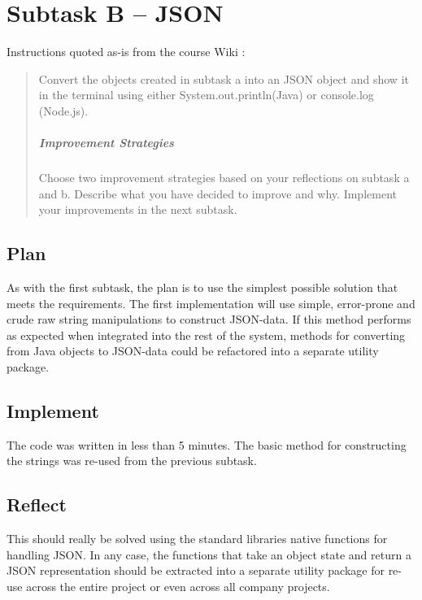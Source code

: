 \section{Subtask B -- JSON}\label{subtask-b-json}
Instructions quoted as-is from the course Wiki \cite{1dv600:lab1:instructions}:

\begin{quote}
  Convert the objects created in subtask a into an JSON object and show it in
  the terminal using either System.out.println(Java) or console.log (Node.js).
  
  \subparagraph{Improvement Strategies}
  
  Choose two improvement strategies based on your reflections on subtask a and
  b. Describe what you have decided to improve and why. Implement your 
  improvements in the next subtask.
\end{quote}

\subsection{Plan}\label{task-1b-plan}
As with the first subtask, the plan is to use the simplest possible solution
that meets the requirements.
The first implementation will use simple, error-prone and crude raw string
manipulations to construct JSON-data.
If this method performs as expected when integrated into the rest of the system,
methods for converting from Java objects to JSON-data could be refactored into
a separate utility package.

\subsection{Implement}\label{task-1b-implement}
The code was written in less than 5 minutes. The basic method for
constructing the strings was re-used from the previous subtask.


\subsection{Reflect}\label{task-1b-reflect}
This should really be solved using the standard libraries native functions for
handling JSON. In any case, the functions that take an object state and return
a JSON representation should be extracted into a separate utility package for
re-use across the entire project or even across all company projects.

